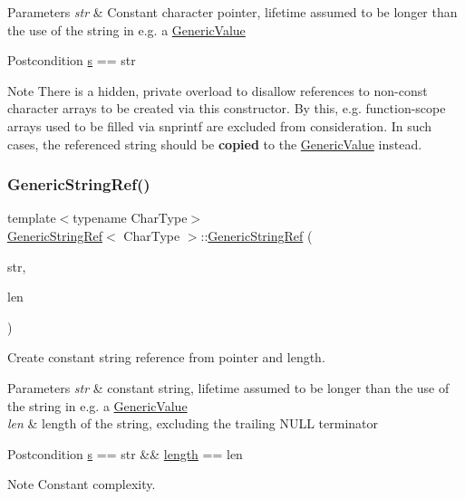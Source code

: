 \begin{DoxyParams}{Parameters}
{\em str} & Constant character pointer, lifetime assumed to be longer than the use of the string in e.\+g. a \hyperlink{a01992}{Generic\+Value}\\
\hline
\end{DoxyParams}
\begin{DoxyPostcond}{Postcondition}
\hyperlink{a02008_ac555994afd329bc9bc1780acf2f9d9be}{s} == str
\end{DoxyPostcond}
\begin{DoxyNote}{Note}
There is a hidden, private overload to disallow references to non-\/const character arrays to be created via this constructor. By this, e.\+g. function-\/scope arrays used to be filled via {\ttfamily snprintf} are excluded from consideration. In such cases, the referenced string should be {\bfseries copied} to the \hyperlink{a01992}{Generic\+Value} instead. 
\end{DoxyNote}
\mbox{\label{a02008_a8b2c6a7fdc4da1e7055f7fdcf0ac517f}} 
\subsubsection{\texorpdfstring{Generic\+String\+Ref()}{GenericStringRef()}\hspace{0.1cm}{\footnotesize\ttfamily [3/3]}}
{\footnotesize\ttfamily template$<$typename Char\+Type$>$ \\
\hyperlink{a02008}{Generic\+String\+Ref}$<$ Char\+Type $>$\+::\hyperlink{a02008}{Generic\+String\+Ref} (\begin{DoxyParamCaption}\item[{const Char\+Type $\ast$}]{str,  }\item[{\hyperlink{a00560_a5ed6e6e67250fadbd041127e6386dcb5}{Size\+Type}}]{len }\end{DoxyParamCaption})\hspace{0.3cm}{\ttfamily [inline]}}



Create constant string reference from pointer and length. 


\begin{DoxyParams}{Parameters}
{\em str} & constant string, lifetime assumed to be longer than the use of the string in e.\+g. a \hyperlink{a01992}{Generic\+Value} \\
\hline
{\em len} & length of the string, excluding the trailing N\+U\+LL terminator\\
\hline
\end{DoxyParams}
\begin{DoxyPostcond}{Postcondition}
\hyperlink{a02008_ac555994afd329bc9bc1780acf2f9d9be}{s} == str \&\& \hyperlink{a02008_a4a96d618744ad73f766a1551b1d517fe}{length} == len 
\end{DoxyPostcond}
\begin{DoxyNote}{Note}
Constant complexity. 
\end{DoxyNote}


